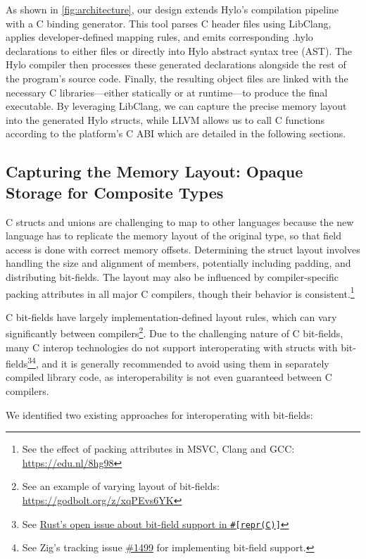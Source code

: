 As shown in \autoref{fig:architecture}, our design extends Hylo's compilation pipeline with a C binding generator. This tool parses C header files using LibClang, applies developer-defined mapping rules, and emits corresponding .hylo declarations to either files or directly into Hylo abstract syntax tree (AST). The Hylo compiler then processes these generated declarations alongside the rest of the program's source code. Finally, the resulting object files are linked with the necessary C libraries—either statically or at runtime—to produce the final executable. By leveraging LibClang, we can capture the precise memory layout into the generated Hylo structs, while LLVM allows us to call C functions according to the platform's C ABI which are detailed in the following sections.

\subsection{Capturing the Memory Layout: Opaque Storage for Composite Types}
\label{ssec:layout-capture}

C structs and unions are challenging to map to other languages because the new language has to replicate the memory layout of the original type, so that field access is done with correct memory offsets. Determining the struct layout involves handling the size and alignment of members, potentially including padding, and distributing bit-fields. The layout may also be influenced by compiler-specific packing attributes in all major C compilers, though their behavior is consistent.\footnote{See the effect of packing attributes in MSVC, Clang and GCC: \url{https://edu.nl/8hg98}}

C bit-fields have largely implementation-defined layout rules, which can vary significantly between compilers\footnote{See an example of varying layout of bit-fields: \url{https://godbolt.org/z/xqPEvs6YK}}. Due to the challenging nature of C bit-fields, many C interop technologies do not support interoperating with structs with bit-fields\footnote{See \href{https://github.com/rust-lang/rfcs/issues/314}{Rust's open issue about bit-field support in \texttt{\#[repr(C)]}}}\footnote{See Zig's tracking issue \href{https://github.com/ziglang/zig/issues/1499}{\#1499} for implementing bit-field support.}, and it is generally recommended to avoid using them in separately compiled library code, as interoperability is not even guaranteed between C compilers.

We identified two existing approaches for interoperating with bit-fields:

